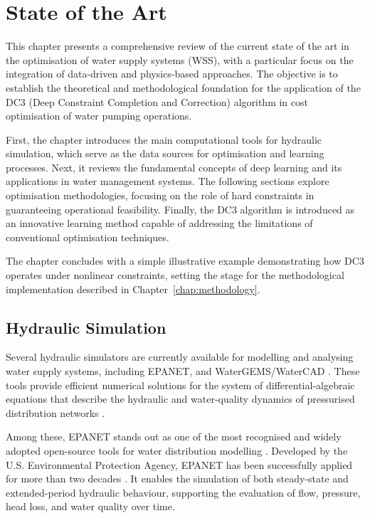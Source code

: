 \chapter{State of the Art}
\label{chapter:state-of-the-art}


\noindent
This chapter presents a comprehensive review of the current state of the art in the optimisation of water supply systems (WSS), with a particular focus on the integration of data-driven and physics-based approaches. 
The objective is to establish the theoretical and methodological foundation for the application of the DC3 (Deep Constraint Completion and Correction) algorithm in cost optimisation of water pumping operations.

First, the chapter introduces the main computational tools for hydraulic simulation, which serve as the data sources for optimisation and learning processes. 
Next, it reviews the fundamental concepts of deep learning and its applications in water management systems. 
The following sections explore optimisation methodologies, focusing on the role of hard constraints in guaranteeing operational feasibility. 
Finally, the DC3 algorithm is introduced as an innovative learning method capable of addressing the limitations of conventional optimisation techniques.

The chapter concludes with a simple illustrative example demonstrating how DC3 operates under nonlinear constraints, setting the stage for the methodological implementation described in Chapter~\ref{chap:methodology}.


\section{Hydraulic Simulation}

Several hydraulic simulators are currently available for modelling and analysing water supply systems, including EPANET\cite{rfc4}, and WaterGEMS/WaterCAD \cite{rfc30}. These tools provide efficient numerical solutions for the system of differential-algebraic equations that describe the hydraulic and water-quality dynamics of pressurised distribution networks \cite{rfc1}.

Among these, EPANET stands out as one of the most recognised and widely adopted open-source tools for water distribution modelling \cite{rfc4}. Developed by the U.S. Environmental Protection Agency, EPANET has been successfully applied for more than two decades \cite{rfc5, rfc6}. It enables the simulation of both steady-state and extended-period hydraulic behaviour, supporting the evaluation of flow, pressure, head loss, and water quality over time. 

